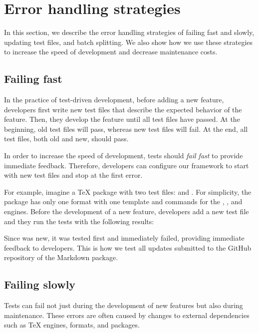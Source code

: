 \documentclass[final]{ltugboat}
\begin{document}
\section{Error handling strategies}
\label{sec:error-handling-strategies}

In this section, we describe the error handling strategies of failing fast and slowly, updating test files, and batch splitting. We also show how we use these strategies to increase the speed of development and decrease maintenance costs.

\subsection{Failing fast}

In the practice of test-driven development, before adding a new feature, developers first write new test files that describe the expected behavior of the feature. Then, they develop the feature until all test files have passed. At the beginning, old test files will pass, whereas new test files will fail. At the end, all test files, both old and new, should pass.

In order to increase the speed of development, tests should \emph{fail fast} to provide immediate feedback. Therefore, developers can configure our framework to start with new test files and stop at the first error.

For example, imagine a \TeX{} package with two test files:  and . For simplicity, the package has only one format with one template and commands for the , , and  engines. Before the development of a new feature, developers add a new test file  and they run the tests with the following results:

\medskip
\noindent
\begingroup
\centering

\par
\endgroup

\medskip
\noindent
Since  was new, it was tested first and immediately failed, providing immediate feedback to developers. This is how we test all updates submitted to the GitHub repository of the Markdown package.

\subsection{Failing slowly}

Tests can fail not just during the development of new features but also during maintenance. These errors are often caused by changes to external dependencies such as \TeX{} engines, formats, and packages.
\end{document}
